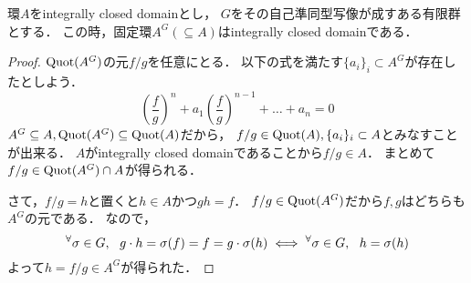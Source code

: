 \documentclass[a4paper]{jsarticle}
\begin{document}
\begin{Lemma}
    環$A$をintegrally closed domainとし，
    $G$をその自己準同型写像が成すある有限群とする．
    この時，固定環$A^G (\subseteq A)$はintegrally closed domainである．
\end{Lemma}
\begin{proof}
    $\operatorname{Quot}(A^G)$の元$f/g$を任意にとる．
    以下の式を満たす$\{a_i\}_i \subset A^G$が存在したとしよう．
    \[ \left( \frac{f}{g} \right)^n+ a_1 \left( \frac{f}{g} \right)^{n-1}+\dots+a_n=0  \]
    $A^G \subseteq A, \operatorname{Quot}(A^G) \subseteq \operatorname{Quot}(A)$だから，
    $f/g \in \operatorname{Quot}(A), \{a_i\}_i \subset A$とみなすことが出来る．
    $A$がintegrally closed domainであることから$f/g \in A$．
    まとめて$f/g \in \operatorname{Quot}(A^G) \cap A$が得られる．
    
    さて，$f/g=h$と置くと$h \in A$かつ$gh=f$．
    $f/g \in \operatorname{Quot}(A^G)$だから$f, g$はどちらも$A^G$の元である．
    なので，
    \[ {}^{\forall} \sigma \in G,~~ g \cdot h=\sigma(f)=f=g \cdot \sigma(h) \iff {}^{\forall} \sigma \in G,~~ h=\sigma(h) \]
    よって$h=f/g \in A^G$が得られた．
\end{proof}
\end{document}
